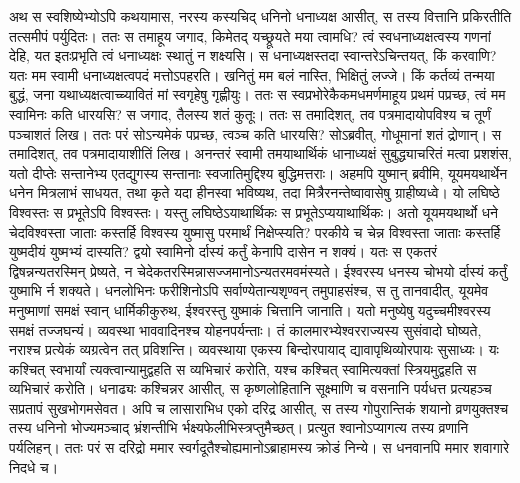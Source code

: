 \adhyAya
{}
\vakya अथ स स्वशिष्येभ्योऽपि कथयामास, नरस्य कस्यचिद् धनिनो धनाध्यक्ष आसीत्, स तस्य वित्तानि प्रकिरतीति तत्समीपं पर्युदितः।
\vakya ततः स तमाहूय जगाद, किमेतद् यच्छ्रूयते मया त्वामधि? त्वं स्वधनाध्यक्षत्वस्य गणनां देहि, यत इतःप्रभृति त्वं धनाध्यक्षः स्थातुं न शक्ष्यसि।
\vakya स धनाध्यक्षस्तदा स्वान्तरेऽचिन्तयत्, किं करवाणि? यतः मम स्वामी धनाध्यक्षत्वपदं मत्तोऽपहरति। खनितुं मम बलं नास्ति, भिक्षितुं लज्जे।
\vakya किं कर्तव्यं तन्मया बुद्धं, जना यथाध्यक्षत्वाच्च्यावितं मां स्वगृहेषु गृह्णीयुः।
\vakya ततः स स्वप्रभोरेकैकमधमर्णमाहूय प्रथमं पप्रच्छ, त्वं मम स्वामिनः कति धारयसि?
\vakya स जगाद, तैलस्य शतं कुतूः। ततः स तमादिशत्, तव पत्रमादायोपविश्य च तूर्णं पञ्चाशतं लिख।
\vakya ततः परं सोऽन्यमेकं पप्रच्छ, त्वञ्च कति धारयसि? सोऽब्रवीत्, गोधूमानां शतं द्रोणान्। स तमादिशत्, तव पत्रमादायाशीतिं लिख।
\vakya अनन्तरं स्वामी तमयाथार्थिकं धानाध्यक्षं सुबुद्ध्याचरितं मत्वा प्रशशंस, यतो दीप्तेः सन्तानेभ्य एतद्युगस्य सन्तानाः स्वजातिमुद्दिश्य बुद्धिमत्तराः।
\vakya अहमपि युष्मान् ब्रवीमि, यूयमयथार्थेन धनेन मित्रलाभं साधयत, तथा कृते यदा हीनस्वा भविष्यथ, तदा मित्रैरनन्तेष्वावासेषु ग्राहीष्यध्वे।
\vakya यो लघिष्ठे विश्वस्तः स प्रभूतेऽपि विश्वस्तः। यस्तु लघिष्ठेऽयाथार्थिकः स प्रभूतेऽप्ययाथार्थिकः।
\vakya अतो यूयमयथार्थो धने चेदविश्वस्ता जाताः कस्तर्हि विश्वस्य युष्मासु परमार्थं निक्षेप्स्यति?
\vakya परकीये च चेन्न विश्वस्ता जाताः कस्तर्हि युष्मदीयं युष्मभ्यं दास्यति? द्वयो स्वामिनो र्दास्यं कर्तुं केनापि दासेन न शक्यं।
\vakya यतः स एकतरं द्विषन्नन्यतरस्मिन् प्रेष्यते, न चेदेकतरस्मिन्नासज्जमानोऽन्यतरमवमंस्यते। ईश्वरस्य धनस्य चोभयो र्दास्यं कर्तुं युष्माभि र्न शक्यते।
\vakya धनलोभिनः फरीशिनोऽपि सर्वाण्येतान्यशृण्वन् तमुपाहसंश्च, स तु तानवादीत्, यूयमेव मनुष्माणां समक्षं स्वान् धार्मिकीकुरुथ, ईश्वरस्तु युष्माकं चित्तानि जानाति।
\vakya यतो मनुष्येषु यदुच्चमीश्वरस्य समक्षं तज्जघन्यं।
\vakya व्यवस्था भाववादिनश्च योहनपर्यन्ताः। तं कालमारभ्येश्वरराज्यस्य सुसंवादो घोष्यते, नराश्च प्रत्येकं व्यग्रत्वेन तत् प्रविशन्ति।
\vakya व्यवस्थाया एकस्य बिन्दोरपायाद् द्यावापृथिव्योरपायः सुसाध्यः।
\vakya यः कश्चित् स्वभार्यां त्यक्त्वान्यामुद्वहति स व्यभिचारं करोति, यश्च कश्चित् स्वामित्यक्तां स्त्रियमुद्वहति स व्यभिचारं करोति।
\vakya धनाढ्यः कश्चिन्नर आसीत्, स कृष्णलोहितानि सूक्ष्माणि च वसनानि पर्यधत्त प्रत्यहञ्च सप्रतापं सुखभोगमसेवत।
\vakya अपि च लासाराभिध एको दरिद्र आसीत्, स तस्य गोपुरान्तिकं शयानो व्रणयुक्तश्च
\vakya तस्य धनिनो भोज्यमञ्चाद् भ्रंशन्तीभि र्भक्ष्यफेलीभिस्त्रप्तुमैच्छत्। प्रत्युत श्वानोऽप्यागत्य तस्य व्रणानि पर्यलिहन्।
\vakya ततः परं स दरिद्रो ममार स्वर्गदूतैश्चोह्यमानोऽब्राहामस्य क्रोडं निन्ये। स धनवानपि ममार शवागारे निदधे च।

